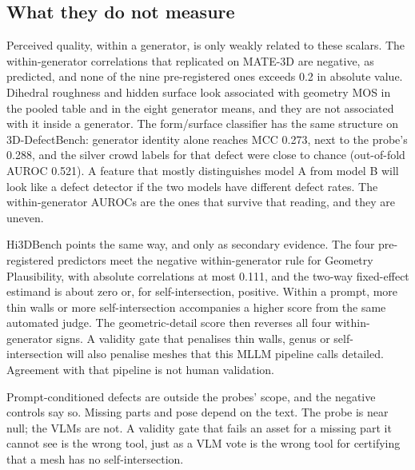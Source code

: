 \subsection{What they do not measure}
Perceived quality, within a generator, is only weakly related to these scalars.
The within-generator correlations that replicated on MATE-3D are negative, as predicted, and none of the nine pre-registered ones exceeds 0.2 in absolute value.
Dihedral roughness and hidden surface look associated with geometry MOS in the pooled table and in the eight generator means, and they are not associated with it inside a generator.
The form/surface classifier has the same structure on 3D-DefectBench: generator identity alone reaches MCC 0.273, next to the probe's 0.288, and the silver crowd labels for that defect were close to chance (out-of-fold AUROC 0.521).
A feature that mostly distinguishes model A from model B will look like a defect detector if the two models have different defect rates.
The within-generator AUROCs are the ones that survive that reading, and they are uneven.

Hi3DBench points the same way, and only as secondary evidence.
The four pre-registered predictors meet the negative within-generator rule for Geometry Plausibility, with absolute correlations at most 0.111, and the two-way fixed-effect estimand is about zero or, for self-intersection, positive.
Within a prompt, more thin walls or more self-intersection accompanies a higher score from the same automated judge.
The geometric-detail score then reverses all four within-generator signs.
A validity gate that penalises thin walls, genus or self-intersection will also penalise meshes that this MLLM pipeline calls detailed.
Agreement with that pipeline is not human validation.

Prompt-conditioned defects are outside the probes' scope, and the negative controls say so.
Missing parts and pose depend on the text.
The probe is near null; the VLMs are not.
A validity gate that fails an asset for a missing part it cannot see is the wrong tool, just as a VLM vote is the wrong tool for certifying that a mesh has no self-intersection.

